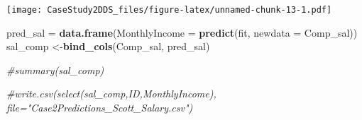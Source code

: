 \documentclass[
]{article}
\newenvironment{Shaded}{\begin{snugshade}}{\end{snugshade}}
\newcommand{\CommentTok}[1]{\textcolor[rgb]{0.56,0.35,0.01}{\textit{#1}}}
\newcommand{\DataTypeTok}[1]{\textcolor[rgb]{0.13,0.29,0.53}{#1}}
\newcommand{\KeywordTok}[1]{\textcolor[rgb]{0.13,0.29,0.53}{\textbf{#1}}}
\newcommand{\NormalTok}[1]{#1}
\newcommand{\StringTok}[1]{\textcolor[rgb]{0.31,0.60,0.02}{#1}}
\begin{document}
\texttt{[image: CaseStudy2DDS\_files/figure-latex/unnamed-chunk-13-1.pdf]}

\begin{Shaded}
\begin{Highlighting}[]
\NormalTok{pred_sal =}\StringTok{ }\KeywordTok{data.frame}\NormalTok{(}\DataTypeTok{MonthlyIncome =} \KeywordTok{predict}\NormalTok{(fit, }\DataTypeTok{newdata =}\NormalTok{ Comp_sal))}
\NormalTok{sal_comp <-}\KeywordTok{bind_cols}\NormalTok{(Comp_sal, pred_sal)}

\CommentTok{#summary(sal_comp)}

\CommentTok{#write.csv(select(sal_comp,ID,MonthlyIncome), file="Case2Predictions_Scott_Salary.csv")}
\end{Highlighting}
\end{Shaded}
\end{document}

